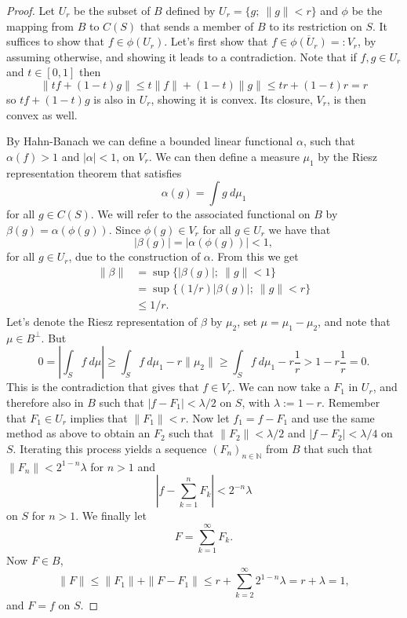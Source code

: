 \documentclass[a4paper,12pt,twoside,BCOR=10mm]{scrbook}
\theoremstyle{definition}
\theoremstyle{definition}
\theoremstyle{definition}
\begin{document}
\begin{proof}
Let $U_r$ be the subset of $B$ defined by $U_r = \{g;\ \|g\| < r\}$ and $\phi$ be the mapping from $B$ to $C(S)$ that sends a member of $B$ to its restriction on $S$.
It suffices to show that $f \in \phi(U_r)$.
Let's first show that $f \in \overline{\phi(U_r)} =: V_r$, by assuming otherwise, and showing it leads to a contradiction.
Note that if $f, g \in U_r$ and $t \in [0, 1]$ then
\[
	\|tf + (1 - t)g\| \leq t\|f\| + (1 - t)\|g\| \leq tr + (1 - t)r = r
\]
so $tf + (1 - t)g$ is also in $U_r$, showing it is convex.
Its closure, $V_r$, is then convex as well.

By Hahn-Banach we can define a bounded linear functional $\alpha$, such that $\alpha(f) > 1$ and $|\alpha| < 1$, on $V_r$.
We can then define a measure $\mu_1$ by the Riesz representation theorem that satisfies
\[
	\alpha(g) = \int g\ d\mu_1
\]
for all $g \in C(S)$.
We will refer to the associated functional on $B$ by $\beta(g) = \alpha(\phi(g))$.
Since $\phi(g) \in V_r$ for all $g \in U_r$ we have that
\[
	|\beta(g)| = |\alpha(\phi(g))| < 1,
\]
for all $g \in U_r$,
	due to the construction of $\alpha$.
From this we get
\begin{align*}
	\| \beta \|
	&= \sup \{ |\beta(g)|;\ \|g\| < 1 \}\\
	&= \sup \{ (1/r)|\beta(g)|;\ \|g\| < r \}\\
	&\leq 1/r.
\end{align*}
Let's
	denote the Riesz representation of $\beta$ by $\mu_2$,
	set $\mu = \mu_1 - \mu_2$,
	and note that $\mu \in B^{\bot}$.
But
\[
	0 = \left | \int_S f\ d\mu \right | 
		\geq \int_S f\ d\mu_1 - r\|\mu_2\| 
		\geq \int_S f\ d\mu_1 - r\frac{1}{r}
		> 1 - r \frac{1}{r} = 0.
\]
This is the contradiction that gives that $f \in V_r$.
We can now take a $F_1$ in $U_r$, and therefore also in $B$ such that $|f - F_1| < \lambda/2$ on $S$, with $\lambda := 1 - r$.
Remember that $F_1 \in U_r$ implies that $\|F_1\| < r$.
Now let $f_1 = f - F_1$ and use the same method as above to obtain an $F_2$ such that $\|F_2\| < \lambda/2$ and $|f - F_2| < \lambda/4$ on $S$.
Iterating this process yields a sequence $(F_n)_{n \in \mathbb{N}}$ from $B$ that such that $\|F_n\| < 2^{1 - n}\lambda$ for $n > 1$ and
\[
	\left | f - \sum_{k = 1}^n F_k \right | < 2^{-n}\lambda
\]
on $S$ for $n > 1$.
We finally let 
\[
F = \sum_{k = 1}^{\infty} F_k.
\]
Now $F \in B$,
\[
	\|F\| \leq \|F_1\| + \|F - F_1\| \leq r + \sum_{k = 2}^{\infty}2^{1 - n}\lambda = r + \lambda = 1,
\]
and $F = f$ on $S$.
\end{proof}
\end{document}
